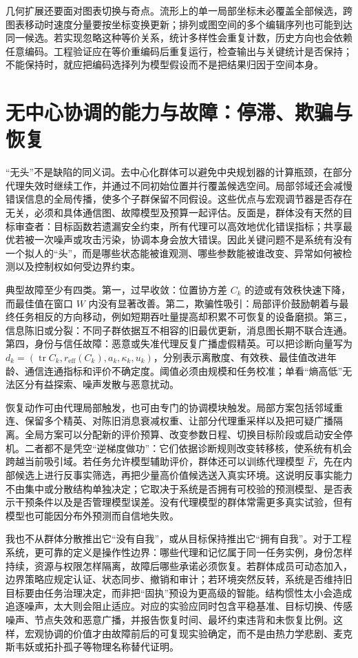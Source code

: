 几何扩展还要面对图表切换与奇点。流形上的单一局部坐标未必覆盖全部候选，跨图表移动时速度分量要按坐标变换更新；排列或图空间的多个编辑序列也可能到达同一候选。若实现忽略这种等价关系，统计多样性会重复计数，历史方向也会依赖任意编码。工程验证应在等价重编码后重复运行，检查输出与关键统计是否保持；不能保持时，就应把编码选择列为模型假设而不是把结果归因于空间本身。

\section{无中心协调的能力与故障：停滞、欺骗与恢复}
\label{sec:section_4145}

“无头”不是缺陷的同义词。去中心化群体可以避免中央规划器的计算瓶颈，在部分代理失效时继续工作，并通过不同初始位置并行覆盖候选空间。局部邻域还会减慢错误信息的全局传播，使多个子群保留不同假设。这些优点与宏观调节器是否存在无关，必须和具体通信图、故障模型及预算一起评估。反面是，群体没有天然的目标审查者：目标函数若遗漏安全约束，所有代理可以高效地优化错误指标；共享最优若被一次噪声或攻击污染，协调本身会放大错误。因此关键问题不是系统有没有一个拟人的“头”，而是哪些状态能被谁观测、哪些参数能被谁改变、异常如何被检测以及控制权如何受边界约束。

典型故障至少有四类。第一，过早收敛：位置协方差 $C_k$ 的迹或有效秩快速下降，而最佳值在窗口 $W$ 内没有显著改善。第二，欺骗性吸引：局部评价鼓励朝着与最终任务相反的方向移动，例如短期吞吐量提高却积累不可恢复的设备磨损。第三，信息陈旧或分裂：不同子群依据互不相容的旧最优更新，消息图长期不联合连通。第四，身份与信任故障：恶意或失准代理反复广播虚假精英。可以把诊断向量写为 $d_k=(\operatorname{tr}C_k,r_{\mathrm{eff}}(C_k),a_k,\kappa_k,u_k)$，分别表示离散度、有效秩、最佳值改进年龄、通信连通指标和评价不确定度。阈值必须由规模和任务校准；单看“熵高低”无法区分有益探索、噪声发散与恶意扰动。

恢复动作可由代理局部触发，也可由专门的协调模块触发。局部方案包括邻域重连、保留多个精英、对陈旧消息衰减权重、让部分代理重采样以及把可疑广播隔离。全局方案可以分配新的评价预算、改变参数日程、切换目标阶段或启动安全停机。二者都不是凭空“逆梯度做功”：它们依据诊断规则改变转移核，使系统有机会跨越当前吸引域。若任务允许模型辅助评价，群体还可以训练代理模型 $\widehat{F}$，先在内部候选上进行反事实筛选，再把少量高价值候选送入真实环境。这说明反事实能力不由集中或分散结构单独决定；它取决于系统是否拥有可校验的预测模型、是否表示干预条件以及是否管理模型误差。没有代理模型的群体常需更多真实试验，但有模型也可能因分布外预测而自信地失败。

我也不从群体分散推出它“没有自我”，或从目标保持推出它“拥有自我”。对于工程系统，更可靠的定义是操作性边界：哪些代理和记忆属于同一任务实例，身份怎样持续，资源与权限怎样隔离，故障后哪些承诺必须恢复。若群体成员可动态加入，边界策略应规定认证、状态同步、撤销和审计；若环境突然反转，系统是否维持旧目标要由任务治理决定，而非把“固执”预设为更高级的智能。结构惯性太小会造成追逐噪声，太大则会阻止适应。对应的实验应同时包含平稳基准、目标切换、传感噪声、节点失效和恶意广播，并报告恢复时间、最坏约束违背和未恢复比例。这样，宏观协调的价值才由故障前后的可复现实验确定，而不是由热力学悲剧、麦克斯韦妖或拓扑孤子等物理名称替代证明。

